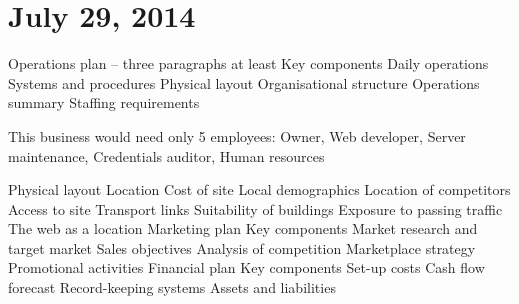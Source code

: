 \section{July 29, 2014}
\begin{outline}
\1 Operations plan -- three paragraphs at least
\2 
\2 Key components
\3 Daily operations
\3 Systems and procedures
\3 Physical layout
\3 Organisational structure
\3 Operations summary
\4 Staffing requirements

This business would need only 5 employees: Owner, Web developer, Server maintenance, Credentials auditor, Human resources

\4 Physical layout
\4 Location
\4 Cost of site
\4 Local demographics
\4 Location of competitors
\4 Access to site
\4 Transport links
\4 Suitability of buildings
\4 Exposure to passing traffic
\4 The web as a location
\1 Marketing plan
\2 Key components
\3 Market research and target market
\3 Sales objectives
\3 Analysis of competition
\3 Marketplace strategy
\3 Promotional activities
\1 Financial plan
\2 Key components
\3 Set-up costs
\3 Cash flow forecast
\3 Record-keeping systems
\3 Assets and liabilities
\end{outline}
